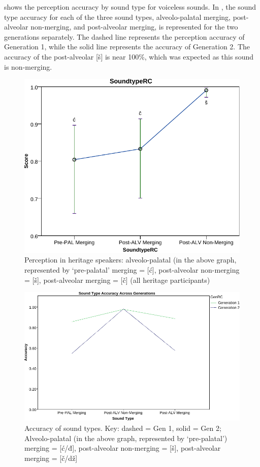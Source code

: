 \documentclass[output=paper,modfonts,newtxmath,hidelinks,]{langscibook}
\begin{document}
 shows the perception accuracy by sound type for voiceless sounds. In , the sound type accuracy for each of the three sound types, alveolo-palatal merging, post-alveolar non-merging, and post-alveolar merging, is represented for the two generations separately. The dashed line represents the perception accuracy of Generation 1, while the solid line represents the accuracy of Generation 2. The accuracy of the post-alveolar [š] is near 100\%, which was expected as this sound is non-merging.

\begin{figure}
\includegraphics[height=.3\textheight]{figures/MCfig6.pdf}
\caption{\label{fig:mihajlovic:6} Perception in heritage speakers: alveolo-palatal (in the above graph, represented by ‘pre-palatal’ merging = [ć], post-alveolar non-merging = [š], post-alveolar merging = [č] (all heritage participants)}
\end{figure}

\begin{figure}
\includegraphics[height=.3\textheight]{figures/MCfig7.pdf}
\caption{\label{fig:mihajlovic:7} Accuracy of sound types. Key: dashed = Gen 1, solid = Gen 2; Alveolo-palatal (in the above graph, represented by ‘pre-palatal’) merging = [ć/đ], post-alveolar non-merging = [š], post-alveolar merging = [č/dž]}
\end{figure}
\end{document}

